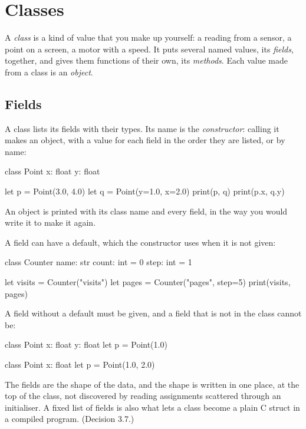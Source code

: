 \chapter{Classes}\label{ch-classes}

A \emph{class} is a kind of value that you make up yourself: a reading
from a sensor, a point on a screen, a motor with a speed. It puts
several named values, its \emph{fields}, together, and gives them
functions of their own, its \emph{methods}. Each value made from a
class is an \emph{object}.

\section{Fields}

A class lists its fields with their types. Its name is the
\emph{constructor}: calling it makes an object, with a value for each
field in the order they are listed, or by name:

\begin{zeno}
class Point {
    x: float
    y: float
}

let p = Point(3.0, 4.0)
let q = Point(y=1.0, x=2.0)
print(p, q)
print(p.x, q.y)
\end{zeno}

An object is printed with its class name and every field, in the way
you would write it to make it again.

A field can have a default, which the constructor uses when it is not
given:

\begin{zeno}
class Counter {
    name: str
    count: int = 0
    step: int = 1
}

let visits = Counter("visits")
let pages = Counter("pages", step=5)
print(visits, pages)
\end{zeno}

A field without a default must be given, and a field that is not in
the class cannot be:

\begin{zeno}[fails=yes]
class Point {
    x: float
    y: float
}
let p = Point(1.0)
\end{zeno}

\begin{zeno}[fails=yes]
class Point {
    x: float
}
let p = Point(1.0, 2.0)
\end{zeno}

\begin{why}
The fields are the shape of the data, and the shape is written in one
place, at the top of the class, not discovered by reading assignments
scattered through an initialiser. A fixed list of fields is also what
lets a class become a plain C struct in a compiled program.
(Decision 3.7.)
\end{why}

